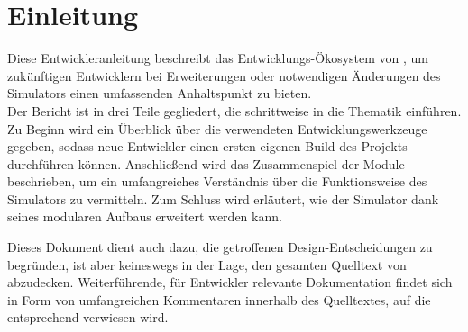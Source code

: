 
\section{Einleitung}

Diese Entwickleranleitung beschreibt das Entwicklungs-Ökosystem von \erasim, um
zukünftigen Entwicklern bei Erweiterungen oder notwendigen Änderungen des
Simulators einen umfassenden Anhaltspunkt zu bieten. \\
Der Bericht ist in drei Teile gegliedert, die schrittweise in die Thematik
einführen. Zu Beginn wird ein Überblick über die verwendeten
Entwicklungswerkzeuge gegeben, sodass neue Entwickler einen ersten eigenen Build
des Projekts durchführen können. Anschließend wird das Zusammenspiel der
Module beschrieben, um ein umfangreiches Verständnis über die Funktionsweise
des Simulators zu vermitteln. Zum Schluss wird erläutert, wie der Simulator
dank seines modularen Aufbaus erweitert werden kann.

Dieses Dokument dient auch dazu, die getroffenen Design-Entscheidungen zu
begründen, ist aber keineswegs in der Lage, den gesamten Quelltext von \erasim
abzudecken. Weiterführende, für Entwickler relevante Dokumentation findet sich
in Form von umfangreichen Kommentaren innerhalb des Quelltextes, auf die
entsprechend verwiesen wird.
